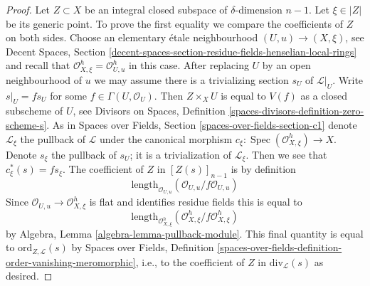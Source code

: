 \documentclass[10pt,a4paper]{amsart}
\theoremstyle{plain}
\theoremstyle{definition}
\theoremstyle{remark}
\numberwithin{equation}{subsection}
\def\Spec{\mathop{\mathrm{Spec}}}
\begin{document}
\begin{proof}
Let $Z \subset X$ be an integral closed subspace of $\delta$-dimension $n - 1$.
Let $\xi \in |Z|$ be its generic point. To prove the first equality
we compare the coefficients of $Z$ on both sides. Choose an elementary
\'etale neighbourhood $(U, u) \to (X, \xi)$, see
Decent Spaces, Section
\ref{decent-spaces-section-residue-fields-henselian-local-rings}
and recall that $\mathcal{O}_{X, \xi}^h = \mathcal{O}_{U, u}^h$
in this case. After replacing $U$ by an open neighbourhood
of $u$ we may assume there is a trivializing section
$s_U$ of $\mathcal{L}|_U$. Write $s|_U = f s_U$ for some
$f \in \Gamma(U, \mathcal{O}_U)$. Then $Z \times_X U$ is
equal to $V(f)$ as a closed subscheme of $U$, see
Divisors on Spaces, Definition \ref{spaces-divisors-definition-zero-scheme-s}.
As in Spaces over Fields, Section \ref{spaces-over-fields-section-c1}
denote $\mathcal{L}_\xi$ the pullback of $\mathcal{L}$
under the canonical morphism
$c_\xi : \Spec(\mathcal{O}_{X, \xi}^h) \to X$.
Denote $s_\xi$ the pullback of $s_U$; it is a trivialization of
$\mathcal{L}_\xi$. Then we see that
$c_\xi^*(s) = fs_\xi$. The coefficient of $Z$ in $[Z(s)]_{n - 1}$
is by definition
$$
\text{length}_{\mathcal{O}_{U, u}}(\mathcal{O}_{U, u}/f\mathcal{O}_{U, u})
$$
Since $\mathcal{O}_{U, u} \to \mathcal{O}_{X, \xi}^h$
is flat and identifies residue fields this is equal to
$$
\text{length}_{\mathcal{O}_{X, \xi}^h}
(\mathcal{O}_{X, \xi}^h/f\mathcal{O}_{X, \xi}^h)
$$
by Algebra, Lemma \ref{algebra-lemma-pullback-module}.
This final quantity is equal to $\text{ord}_{Z, \mathcal{L}}(s)$ by
Spaces over Fields, Definition
\ref{spaces-over-fields-definition-order-vanishing-meromorphic}, i.e.,
to the coefficient of $Z$ in
$\text{div}_\mathcal{L}(s)$
as desired.
\end{proof}
\end{document}
